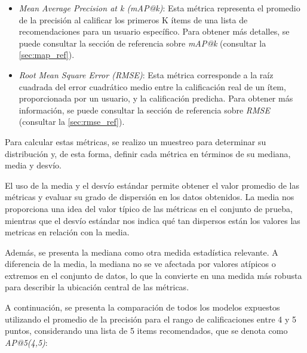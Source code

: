 \documentclass[11pt,a4paper,twoside]{thesis}
\begin{document}
\begin{itemize}
	\item \textit{Mean Average Precision at k (mAP@k)}: Esta métrica representa el promedio de la precisión al calificar
	      los primeros K ítems de una lista de recomendaciones para un usuario específico.
	      Para obtener más detalles, se puede consultar la sección de referencia sobre \textit{mAP@k} (consultar la \autoref{sec:map_ref}).
	\item \textit{Root Mean Square Error (RMSE)}: Esta métrica corresponde a la raíz cuadrada del error cuadrático
	      medio entre la calificación real de un ítem, proporcionada por un usuario, y la calificación predicha. Para obtener más información,
	      se puede consultar la sección de referencia sobre \textit{RMSE} (consultar la \autoref{sec:rmse_ref}).
\end{itemize}

Para calcular estas métricas, se realizo un muestreo para determinar su
distribución y, de esta forma, definir cada métrica en términos de su mediana,
media y desvío.

El uso de la media y el desvío estándar permite obtener el valor promedio de
las métricas y evaluar su grado de dispersión en los datos obtenidos. La media
nos proporciona una idea del valor típico de las métricas en el conjunto de
prueba, mientras que el desvío estándar nos indica qué tan dispersos están los
valores las metricas en relación con la media.

Además, se presenta la mediana como otra medida estadística relevante. A
diferencia de la media, la mediana no se ve afectada por valores atípicos o
extremos en el conjunto de datos, lo que la convierte en una medida más robusta
para describir la ubicación central de las métricas.

A continuación, se presenta la comparación de todos los modelos expuestos
utilizando el promedio de la precisión para el rango de calificaciones entre 4
y 5 puntos, considerando una lista de 5 items recomendados, que se denota como
\textit{AP@5(4,5)}:
\end{document}
